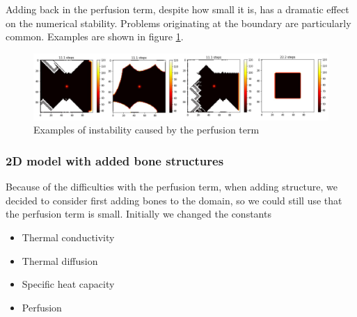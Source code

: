 \documentclass[11pt]{article} %
\begin{document}
Adding back in the perfusion term, despite how small it is, has a dramatic effect on the numerical stability. Problems originating at the boundary are particularly common. Examples are shown in figure \ref{fig:instability}.



\begin{figure}
	\centering
	\includegraphics[width=0.95\linewidth]{Report_images/instability}
	\caption{Examples of instability caused by the perfusion term}
	\label{fig:instability}
\end{figure}

\subsubsection{2D model with added bone structures}	 	

Because of the difficulties with the perfusion term, when adding structure, we decided to consider first adding bones to the domain, so we could still use that the perfusion term is small. Initially we changed the constants

\begin{itemize}
	\item  Thermal conductivity
	\item  Thermal diffusion 
	\item  Specific heat capacity
	\item  Perfusion 
\end{itemize}
\end{document}
